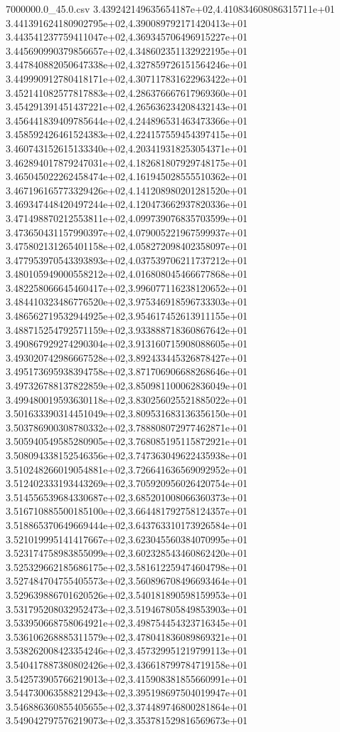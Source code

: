 \begin{filecontents*}{7000000.0_45.0.csv}
3.439242149635654187e+02,4.410834608086315711e+01
3.441391624180902795e+02,4.390089792171420413e+01
3.443541237759411047e+02,4.369345706496915227e+01
3.445690990379856657e+02,4.348602351132922195e+01
3.447840882050647338e+02,4.327859726151564246e+01
3.449990912780418171e+02,4.307117831622963422e+01
3.452141082577817883e+02,4.286376667617969360e+01
3.454291391451437221e+02,4.265636234208432143e+01
3.456441839409785644e+02,4.244896531463473366e+01
3.458592426461524383e+02,4.224157559454397415e+01
3.460743152615133340e+02,4.203419318253054371e+01
3.462894017879247031e+02,4.182681807929748175e+01
3.465045022262458474e+02,4.161945028555510362e+01
3.467196165773329426e+02,4.141208980201281520e+01
3.469347448420497244e+02,4.120473662937820336e+01
3.471498870212553811e+02,4.099739076835703599e+01
3.473650431157990397e+02,4.079005221967599937e+01
3.475802131265401158e+02,4.058272098402358097e+01
3.477953970543393893e+02,4.037539706211737212e+01
3.480105949000558212e+02,4.016808045466677868e+01
3.482258066645460417e+02,3.996077116238120652e+01
3.484410323486776520e+02,3.975346918596733303e+01
3.486562719532944925e+02,3.954617452613911155e+01
3.488715254792571159e+02,3.933888718360867642e+01
3.490867929274290304e+02,3.913160715908088605e+01
3.493020742986667528e+02,3.892433445326878427e+01
3.495173695938394758e+02,3.871706906688268646e+01
3.497326788137822859e+02,3.850981100062836049e+01
3.499480019593630118e+02,3.830256025521885022e+01
3.501633390314451049e+02,3.809531683136356150e+01
3.503786900308780332e+02,3.788808072977462871e+01
3.505940549585280905e+02,3.768085195115872921e+01
3.508094338152546356e+02,3.747363049622435938e+01
3.510248266019054881e+02,3.726641636569092952e+01
3.512402333193443269e+02,3.705920956026420754e+01
3.514556539684330687e+02,3.685201008066360373e+01
3.516710885500185100e+02,3.664481792758124357e+01
3.518865370649669444e+02,3.643763310173926584e+01
3.521019995141417667e+02,3.623045560384070995e+01
3.523174758983855099e+02,3.602328543460862420e+01
3.525329662185686175e+02,3.581612259474604798e+01
3.527484704755405573e+02,3.560896708496693464e+01
3.529639886701620526e+02,3.540181890598159953e+01
3.531795208032952473e+02,3.519467805849853903e+01
3.533950668758064921e+02,3.498754454323716345e+01
3.536106268885311579e+02,3.478041836089869321e+01
3.538262008423354246e+02,3.457329951219799113e+01
3.540417887380802426e+02,3.436618799784719158e+01
3.542573905766219013e+02,3.415908381855660991e+01
3.544730063588212943e+02,3.395198697504019947e+01
3.546886360855405655e+02,3.374489746800281864e+01
3.549042797576219073e+02,3.353781529816569673e+01

\end{filecontents*}

